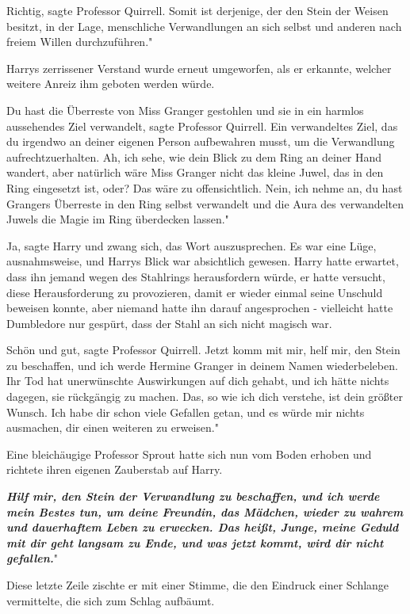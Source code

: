\glqq{}Richtig\grqq{}, sagte Professor Quirrell. \glqq{}Somit ist derjenige, der
den Stein der Weisen besitzt, in der Lage, menschliche Verwandlungen an sich
selbst und anderen nach freiem Willen durchzuführen."

Harrys zerrissener Verstand wurde erneut umgeworfen, als er erkannte, welcher
weitere Anreiz ihm geboten werden würde.

\glqq{}Du hast die Überreste von Miss Granger gestohlen und sie in ein harmlos
aussehendes Ziel verwandelt\grqq{}, sagte Professor Quirrell. \glqq{}Ein
verwandeltes Ziel, das du irgendwo an deiner eigenen Person aufbewahren musst,
um die Verwandlung aufrechtzuerhalten. Ah, ich sehe, wie dein Blick zu dem Ring
an deiner Hand wandert, aber natürlich wäre Miss Granger nicht das kleine Juwel,
das in den Ring eingesetzt ist, oder? Das wäre zu offensichtlich. Nein, ich
nehme an, du hast Grangers Überreste in den Ring selbst verwandelt und die Aura
des verwandelten Juwels die Magie im Ring überdecken lassen."

\glqq{}Ja\grqq{}, sagte Harry und zwang sich, das Wort auszusprechen. Es war eine
Lüge, ausnahmsweise, und Harrys Blick war absichtlich gewesen. Harry hatte
erwartet, dass ihn jemand wegen des Stahlrings herausfordern würde, er hatte
versucht, diese Herausforderung zu provozieren, damit er wieder einmal seine
Unschuld beweisen konnte, aber niemand hatte ihn darauf angesprochen -
vielleicht hatte Dumbledore nur gespürt, dass der Stahl an sich nicht magisch
war.

\glqq{}Schön und gut\grqq{}, sagte Professor Quirrell. \glqq{}Jetzt komm mit mir,
helf mir, den Stein zu beschaffen, und ich werde Hermine Granger in deinem Namen
wiederbeleben. Ihr Tod hat unerwünschte Auswirkungen auf dich gehabt, und ich
hätte nichts dagegen, sie rückgängig zu machen. Das, so wie ich dich verstehe,
ist dein größter Wunsch. Ich habe dir schon viele Gefallen getan, und es würde
mir nichts ausmachen, dir einen weiteren zu erweisen."

Eine bleichäugige Professor Sprout hatte sich nun vom Boden erhoben und richtete
ihren eigenen Zauberstab auf Harry.

\glqq{}\textbf{\emph{Hilf mir, den Stein der Verwandlung zu beschaffen, und ich
werde mein Bestes tun, um deine Freundin, das Mädchen, wieder zu wahrem und
dauerhaftem Leben zu erwecken. Das heißt, Junge, meine Geduld mit dir geht
langsam zu Ende, und was jetzt kommt, wird dir nicht gefallen.}}"

Diese letzte Zeile zischte er mit einer Stimme, die den Eindruck einer Schlange
vermittelte, die sich zum Schlag aufbäumt.


